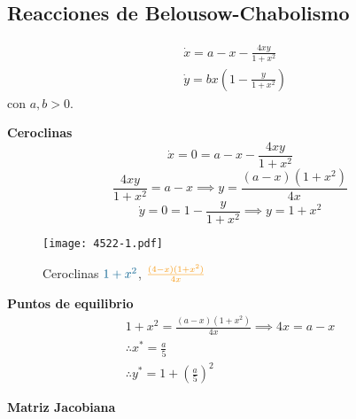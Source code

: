 \subsection{Reacciones de Belousow-Chabolismo}
\begin{align*}
  &\dot{x}=a-x - \frac{4xy}{1+x^2} \\
  &\dot{y} = bx \left( 1- \frac{y}{1+x^2} \right) 
\end{align*}
con $a,b> 0$.

\textbf{Ceroclinas}
\begin{equation*}
  \dot{x} = 0 = a-x- \frac{4xy}{1+x^2} 
\end{equation*}
\begin{equation*}
	\frac{4xy}{1+x^2}=a-x \implies y = \frac{(a-x)(1+x^2)}{4x} 
\end{equation*}
\begin{equation*}
  \dot{y} = 0 = 1 - \frac{y}{1+x^2} \implies y = 1+x^2 
\end{equation*}
\begin{figure}[H]
  \centering
  \texttt{[image: 4522-1.pdf]}
  \caption{Ceroclinas $\color{MidnightBlue}{1+x^2}$, $ \color{YellowOrange}{\frac{(4-x)(1+x^2)}{4x}}$ }
\end{figure}
\textbf{Puntos de equilibrio}
\begin{gather*}
	1+x^2 = \frac{(a-x)(1+x^2)}{4x} \implies 4x = a-x \\
	\therefore x^* = \frac{a}{5} \\
	\therefore y^*=1+ \left( \frac{a}{5} \right) ^2
\end{gather*}

\textbf{Matriz Jacobiana}

